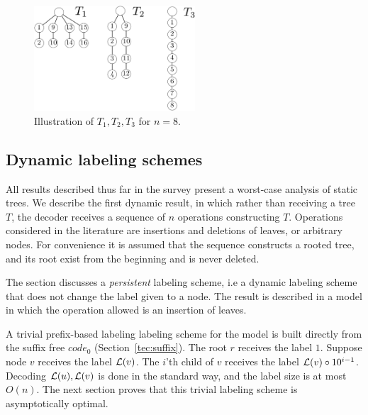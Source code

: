 			\begin{figure}[!ht] 
				\centering
				\includegraphics[width=60mm]{./Figures/Lowerbound-ancestry.pdf}
				\caption{Illustration of $T_1,T_2,T_3$ for $n=8$. }
				\label{fig:TheosDrawing}
			\end{figure}


\subsection{Dynamic \ancestry labeling schemes}	\label{sub-anc-dynamic}	
			All results described thus far in the survey present a worst-case analysis of static trees.
			We  describe the first dynamic result, in which rather than receiving a tree $T$, the decoder receives a sequence of $n$ operations constructing $T$.
			Operations considered in the literature are insertions  and deletions of leaves, or arbitrary nodes.
			For convenience  it is assumed that the sequence constructs a rooted tree, and its root exist from the beginning and  is never  deleted.
			
			The section discusses a  \emph{persistent} \ancestry labeling scheme, i.e a dynamic labeling scheme that does not change the label given to a node.
			The result is described in a model in which the operation allowed is an  insertion of  leaves.

			A trivial prefix-based labeling \ancestry labeling scheme for the model is  built directly from the suffix free  $code_0$ (Section~\ref{tec:suffix}).
			The root $r$ receives the label $1$. Suppose   node $v$ receives the label $ \mathcal{L}(v)$. The $i$'th child of $v$ receives the label $ \mathcal{L}(v) \circ 10^{i-1}$.
			Decoding $ \mathcal{L}(u), \mathcal{L}(v)$ is done in the standard way, and the label size is at most $O(n)$.
			The next section proves that this trivial labeling scheme is asymptotically  optimal.
			
